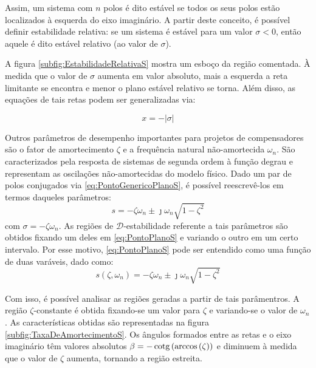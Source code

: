 Assim, um sistema com $n$ polos é dito estável se todos os seus polos estão localizados à esquerda do eixo imaginário. A partir deste conceito, é possível definir estabilidade relativa: se um sistema é estável para um valor $\sigma < 0$, então aquele é dito estável relativo (ao valor de $\sigma$).

A figura \ref{subfig:EstabilidadeRelativaS} mostra um esboço da região comentada. À medida que o valor de $\sigma$ aumenta em valor absoluto, mais a esquerda a reta limitante se encontra e menor o plano estável relativo se torna. Além disso, as equações de tais retas podem ser generalizadas via:

\begin{equation}
  x = -|\sigma|\label{eq:Sigma}
\end{equation}

Outros parâmetros de desempenho importantes para projetos de compensadores são o fator de amortecimento $\zeta$ e a frequência natural não-amortecida $\omega_n$. São caracterizados pela resposta de sistemas de segunda ordem à função degrau \cite{NISE2011}\cite{OGATA2011} e representam as oscilações não-amortecidas do modelo físico. Dado um par de polos conjugados via \eqref{eq:PontoGenericoPlanoS}, é possível reescrevê-los em termos daqueles parâmetros:
\begin{equation}
  s = -\zeta\omega_n \pm \jmath\omega_n \sqrt {1-\zeta^2} \label{eq:PontoPlanoS}
\end{equation}
com $\sigma = -\zeta\omega_n$. As regiões de $\mathscr{D}$-estabilidade referente a tais parâmetros são obtidos fixando um deles em \eqref{eq:PontoPlanoS} e variando o outro em um certo intervalo. Por esse motivo, \eqref{eq:PontoPlanoS} pode ser entendido como uma função de duas varáveis, dado como:
\begin{equation}
  s(\zeta,\omega_n) = -\zeta\omega_n \pm \jmath\omega_n \sqrt {1-\zeta^2} \label{eq:FuncaoPontoPlanoS}
\end{equation}

Com isso, é possível analisar as regiões geradas a partir de tais parâmentros. A região $\zeta$-constante é obtida fixando-se um valor para $\zeta$ e variando-se o valor de $\omega_n$. As características obtidas são representadas na figura \ref{subfig:TaxaDeAmortecimentoS}. Os ângulos formados entre as retas e o eixo imaginário têm valores absolutos $\beta = -\operatorname{cotg}{\left(\arccos{\left(\zeta\right)}\right)}$ e diminuem à medida que o valor de $\zeta$ aumenta, tornando a região estreita.

